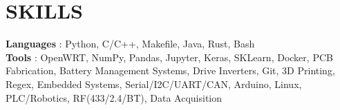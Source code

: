 \section{SKILLS}
\begin{itemize}[leftmargin=0in, label={}]
    \small{\item{
                    \textbf{Languages} {: Python, C/C++, Makefile, Java, Rust, Bash}\vspace{2pt} \\
                    \textbf{Tools}     {: OpenWRT, NumPy, Pandas, Jupyter, Keras, SKLearn, Docker, PCB Fabrication, Battery Management Systems, Drive Inverters, Git, 3D Printing, Regex, Embedded Systems, Serial/I2C/UART/CAN, Arduino, Linux, PLC/Robotics, RF(433/2.4/BT), Data Acquisition}
              }}
\end{itemize}
